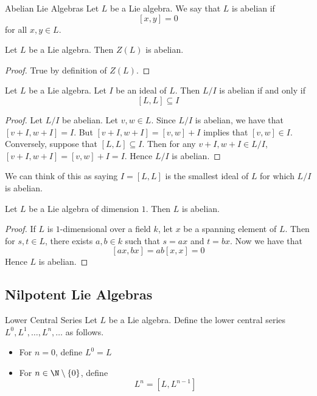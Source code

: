 \documentclass[a4paper]{article}
\begin{document}
\begin{defn}{Abelian Lie Algebras}{} Let $L$ be a Lie algebra. We say that $L$ is abelian if $$[x,y]=0$$ for all $x,y\in L$. 
\end{defn}

\begin{lmm}{}{} Let $L$ be a Lie algebra. Then $Z(L)$ is abelian. \tcbline
\begin{proof}
True by definition of $Z(L)$. 
\end{proof}
\end{lmm}

\begin{lmm}{}{} Let $L$ be a Lie algebra. Let $I$ be an ideal of $L$. Then $L/I$ is abelian if and only if $$[L,L]\subseteq I$$ \tcbline
\begin{proof}
Let $L/I$ be abelian. Let $v,w\in L$. Since $L/I$ is abelian, we have that $[v+I,w+I]=I$. But $[v+I,w+I]=[v,w]+I$ implies that $[v,w]\in I$. Conversely, suppose that $[L,L]\subseteq I$. Then for any $v+I,w+I\in L/I$, $[v+I,w+I]=[v,w]+I=I$. Hence $L/I$ is abelian. 
\end{proof}
\end{lmm}

We can think of this as saying $I=[L,L]$ is the smallest ideal of $L$ for which $L/I$ is abelian. 

\begin{prp}{}{} Let $L$ be a Lie algebra of dimension $1$. Then $L$ is abelian. \tcbline
\begin{proof}
If $L$ is $1$-dimensional over a field $k$, let $x$ be a spanning element of $L$. Then for $s,t\in L$, there exists $a,b\in k$ such that $s=ax$ and $t=bx$. Now we have that $$[ax,bx]=ab[x,x]=0$$ Hence $L$ is abelian. 
\end{proof}
\end{prp}

\subsection{Nilpotent Lie Algebras}
\begin{defn}{Lower Central Series}{} Let $L$ be a Lie algebra. Define the lower central series $L^0,L^1,\dots,L^n,\dots$ as follows. 
\begin{itemize}
\item For $n=0$, define $L^0=L$
\item For $n\in\N\setminus\{0\}$, define $$L^n=[L,L^{n-1}]$$
\end{itemize}
\end{defn}
\end{document}
